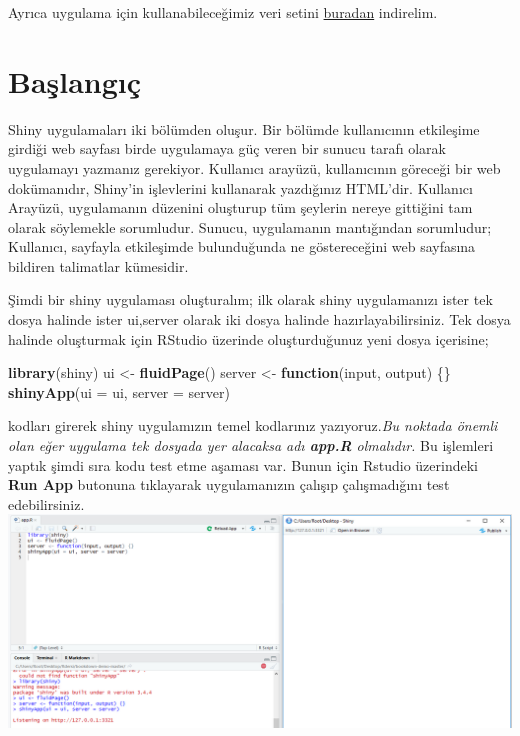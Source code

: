 \documentclass[]{book}
\newenvironment{Shaded}{\begin{snugshade}}{\end{snugshade}}
\newcommand{\KeywordTok}[1]{\textcolor[rgb]{0.13,0.29,0.53}{\textbf{#1}}}
\newcommand{\DataTypeTok}[1]{\textcolor[rgb]{0.13,0.29,0.53}{#1}}
\newcommand{\StringTok}[1]{\textcolor[rgb]{0.31,0.60,0.02}{#1}}
\newcommand{\ControlFlowTok}[1]{\textcolor[rgb]{0.13,0.29,0.53}{\textbf{#1}}}
\newcommand{\NormalTok}[1]{#1}
\begin{document}
Ayrıca uygulama için kullanabileceğimiz veri setini
\href{https://deanattali.com/files/bcl-data.csv}{buradan} indirelim.

\section{Başlangıç}\label{baslangc-1}

Shiny uygulamaları iki bölümden oluşur. Bir bölümde kullanıcının
etkileşime girdiği web sayfası birde uygulamaya güç veren bir sunucu
tarafı olarak uygulamayı yazmanız gerekiyor. Kullanıcı arayüzü,
kullanıcının göreceği bir web dokümanıdır, Shiny'in işlevlerini
kullanarak yazdığınız HTML'dir. Kullanıcı Arayüzü, uygulamanın düzenini
oluşturup tüm şeylerin nereye gittiğini tam olarak söylemekle
sorumludur. Sunucu, uygulamanın mantığından sorumludur; Kullanıcı,
sayfayla etkileşimde bulunduğunda ne göstereceğini web sayfasına
bildiren talimatlar kümesidir.

Şimdi bir shiny uygulaması oluşturalım; ilk olarak shiny uygulamanızı
ister tek dosya halinde ister ui,server olarak iki dosya halinde
hazırlayabilirsiniz. Tek dosya halinde oluşturmak için RStudio üzerinde
oluşturduğunuz yeni dosya içerisine;

\begin{Shaded}
\begin{Highlighting}[]
\KeywordTok{library}\NormalTok{(shiny)}
\NormalTok{ui <-}\StringTok{ }\KeywordTok{fluidPage}\NormalTok{()}
\NormalTok{server <-}\StringTok{ }\ControlFlowTok{function}\NormalTok{(input, output) \{\}}
\KeywordTok{shinyApp}\NormalTok{(}\DataTypeTok{ui =}\NormalTok{ ui, }\DataTypeTok{server =}\NormalTok{ server)}
\end{Highlighting}
\end{Shaded}

kodları girerek shiny uygulamızın temel kodlarınız yazıyoruz.\emph{Bu
noktada önemli olan eğer uygulama tek dosyada yer alacaksa adı
\textbf{app.R} olmalıdır.} Bu işlemleri yaptık şimdi sıra kodu test etme
aşaması var. Bunun için Rstudio üzerindeki \textbf{Run App} butonuna
tıklayarak uygulamanızın çalışıp çalışmadığını test edebilirsiniz.
\includegraphics{resim5.png}
\end{document}
